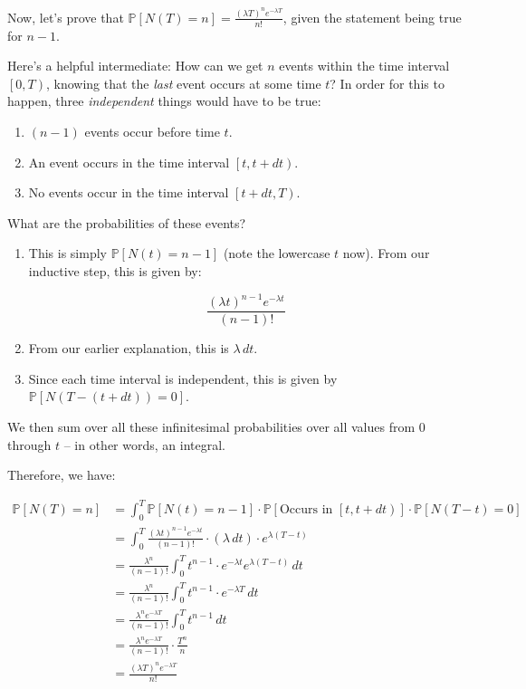 Now, let's prove that $\mathbb{P}\left[N(T) = n\right] = \frac{(\lambda T)^n e^{-\lambda T}}{n!}$, given the statement being true for $n-1$. 

Here's a helpful intermediate: How can we get $n$ events within the time interval $\left[0, T\right)$, knowing that the \emph{last} event occurs at some time $t$? In order for this to happen, three \emph{independent} things would have to be true:

\begin{enumerate}
\item $(n-1)$ events occur before time $t$. 
\item An event occurs in the time interval $\left[t, t + dt\right)$.
\item No events occur in the time interval $\left[t + dt, T\right)$. 
\end{enumerate}

What are the probabilities of these events?

\begin{enumerate}
\item This is simply $\mathbb{P}\left[N(t) = n-1\right]$ (note the lowercase $t$ now). From our inductive step, this is given by:

\begin{equation*}
\frac{(\lambda t)^{n-1} e^{-\lambda t}}{(n-1)!}
\end{equation*}

\item From our earlier explanation, this is $\lambda \, dt$. 
\item Since each time interval is independent, this is given by $\mathbb{P}\left[N(T - (t + dt)) = 0\right]$. %
\end{enumerate}


We then sum over all these infinitesimal probabilities over all values from 0 through $t$ -- in other words, an integral. 

Therefore, we have:

\begin{align*}
\mathbb{P}\left[N(T) = n\right] &= \int_{0}^{T} \mathbb{P}\left[N(t) = n-1\right] \cdot \mathbb{P}\left[\text{Occurs in $\left[t, t+dt\right)$}\right] \cdot \mathbb{P}\left[N(T-t) = 0\right] \\
&= \int_{0}^{T} \frac{(\lambda t)^{n-1} e^{-\lambda t}}{(n-1)!} \cdot (\lambda \, dt) \cdot e^{\lambda(T-t)} \\
&= \frac{\lambda^n}{(n-1)!} \int_{0}^{T} t^{n-1} \cdot e^{-\lambda t}e^{\lambda(T-t)} \, dt \\
&= \frac{\lambda^n}{(n-1)!} \int_{0}^{T} t^{n-1} \cdot e^{-\lambda T} \, dt \\
&= \frac{\lambda^n  e^{-\lambda T}}{(n-1)!} \int_{0}^{T}  t^{n-1} \, dt \\
&= \frac{\lambda^n  e^{-\lambda T}}{(n-1)!} \cdot \frac{T^n}{n} \\
&= \frac{(\lambda T)^n  e^{-\lambda T}}{n!} \\
\end{align*}




